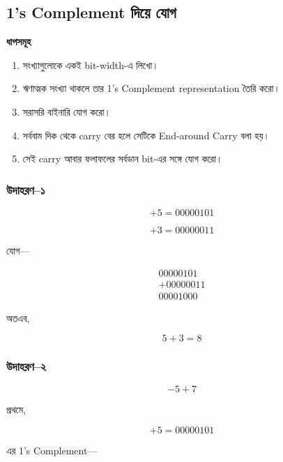 
\subsection{\textenglish{1's Complement} দিয়ে যোগ}

\par\begingroup

\textbf{ধাপসমূহ}

\begin{enumerate}
    \item সংখ্যাগুলোকে একই \textenglish{bit-width}-এ লিখো।
    \item ঋণাত্মক সংখ্যা থাকলে তার
    \textenglish{1's Complement representation} তৈরি করো।
    \item সরাসরি বাইনারি যোগ করো।
    \item সর্ববাম দিক থেকে \textenglish{carry} বের হলে
    সেটিকে \textenglish{End-around Carry} বলা হয়।
    \item সেই \textenglish{carry} আবার ফলাফলের
    সর্বডান \textenglish{bit}-এর সঙ্গে যোগ করো।
\end{enumerate}
\par\endgroup


\subsubsection*{উদাহরণ--১}

\[
+5=00000101
\]

\[
+3=00000011
\]

যোগ—

\[
\begin{array}{r}
00000101\\
+00000011\\
\hline
00001000
\end{array}
\]

অতএব,

\[
\boxed{5+3=8}
\]

\subsubsection*{উদাহরণ--২}

\[
-5+7
\]

প্রথমে,

\[
+5=00000101
\]

এর \textenglish{1's Complement}—


